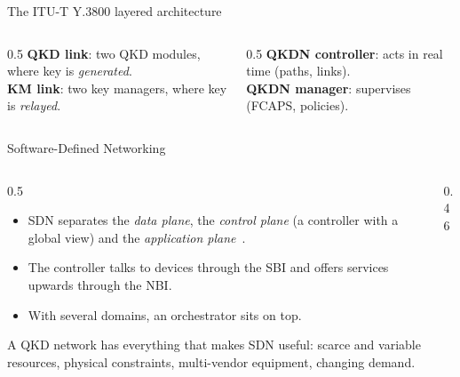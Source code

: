 \documentclass[10pt]{beamer}
\begin{document}
\begin{frame}{The ITU-T Y.3800 layered architecture}
  \small
  \begin{columns}[T]
    \begin{column}{0.5\textwidth}
      \textbf{QKD link}: two QKD modules, where key is \emph{generated}.\\
      \textbf{KM link}: two key managers, where key is \emph{relayed}.
    \end{column}
    \begin{column}{0.5\textwidth}
      \textbf{QKDN controller}: acts in real time (paths, links).\\
      \textbf{QKDN manager}: supervises (FCAPS, policies).
    \end{column}
  \end{columns}
\end{frame}

\begin{frame}{Software-Defined Networking}
  \begin{columns}[c]
    \begin{column}{0.5\textwidth}
      \begin{itemize}
        \item SDN separates the \emph{data plane}, the \emph{control
              plane} (a controller with a global view) and the
              \emph{application plane}~\cite{kreutz2015}.
        \item The controller talks to devices through the \alert{SBI} and
              offers services upwards through the \alert{NBI}.
        \item With several domains, an \alert{orchestrator} sits on top.
      \end{itemize}
      \vspace{1ex}
      \small A QKD network has everything that makes SDN useful: scarce and
      variable resources, physical constraints, multi-vendor equipment,
      changing demand.
    \end{column}
    \begin{column}{0.46\textwidth}
      \begin{center}
      \end{center}
    \end{column}
  \end{columns}
\end{frame}
\end{document}
